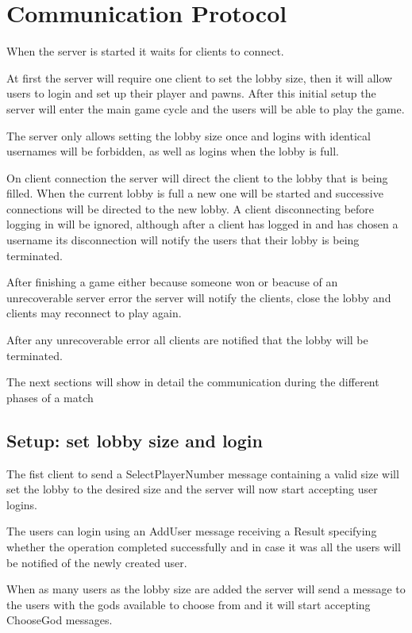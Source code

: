 \documentclass{article}
\begin{document}
\section*{Communication Protocol}
When the server is started it waits for clients to connect.

At first the server will require one client to set the lobby size, then it will allow users to login and set up their player and pawns. After this initial setup the server will enter the main game cycle and the users will be able to play the game.

The server only allows setting the lobby size once and logins with identical usernames will be forbidden, as well as logins when the lobby is full.

On client connection the server will direct the client to the lobby that is being filled. When the current lobby is full a new one will be started and successive connections will be directed to the new lobby.
A client disconnecting before logging in will be ignored, although after a client has logged in and has chosen a username its disconnection will notify the users that their lobby is being terminated.

After finishing a game either because someone won or beacuse of an unrecoverable server error the server will notify the clients, close the lobby and clients may reconnect to play again.

After any unrecoverable error all clients are notified that the lobby will be terminated.

\vspace{8pt}

\noindent
The next sections will show in detail the communication during the different phases of a match

\subsection*{Setup: set lobby size and login}
The fist client to send a SelectPlayerNumber message containing a valid size will set the lobby to the desired size and the server will now start accepting user logins.

The users can login using an AddUser message receiving a Result specifying whether the operation completed successfully and in case it was all the users will be notified of the newly created user.

When as many users as the lobby size are added the server will send a message to the users with the gods available to choose from and it will start accepting ChooseGod messages.
\end{document}
